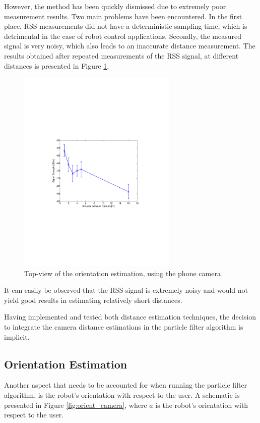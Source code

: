 \documentclass[journal]{IEEEtran}
\let\MYoriglatexcaption\caption
\renewcommand{\caption}[2][\relax]{\MYoriglatexcaption[#2]{#2}}
\begin{document}
However, the method has been quickly dismissed due to extremely poor measurement results. Two main problems have been encountered. In the first place, RSS measurements did not have a deterministic sampling time, which is detrimental in the case of robot control applications. Secondly, the measured signal is very noisy, which also leads to an inaccurate distance measurement. The results obtained after repeated measurements of the RSS signal, at different distances is presented in Figure \ref{fig:rss}.
\begin{figure}[!htpb]
\centering
\includegraphics[width=3in]{images/rss_variance}
\caption{Top-view of the orientation estimation, using the phone camera}
\label{fig:rss}
\end{figure}

It can easily be observed that the RSS signal is extremely noisy and would not yield good results in estimating relatively short distances.

Having implemented and tested both distance estimation techniques, the decision to integrate the camera distance estimations in the particle filter algorithm is implicit.

\subsection{Orientation Estimation}

Another aspect that needs to be accounted for when running the particle filter algorithm, is the robot's orientation with respect to the user. A schematic is presented in Figure \ref{fig:orient_camera}, where $a$ is the robot's orientation with respect to the user.
\end{document}
